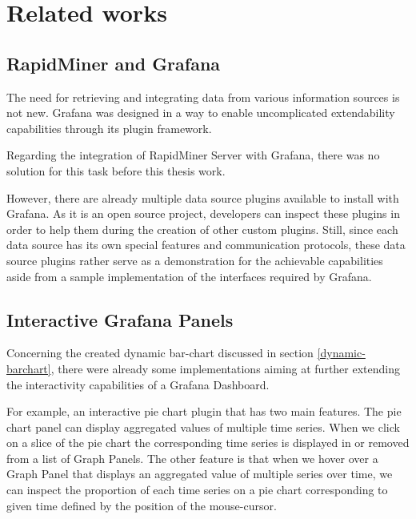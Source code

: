 \chapter{Related works}

%
%
%


\section{RapidMiner and Grafana}

The need for retrieving and integrating data from various information sources is not new. Grafana was designed in a way to enable uncomplicated extendability capabilities through its plugin framework.



Regarding the integration of RapidMiner Server with Grafana, there was no solution for this task before this thesis work.

However, there are already multiple data source plugins available to install with Grafana. As it is an open source project, developers can inspect these plugins in order to help them during the creation of other custom plugins. Still, since each data source has its own special features and communication protocols, these data source plugins rather serve as a demonstration for the achievable capabilities aside from a sample implementation of the interfaces required by Grafana.

\section{Interactive Grafana Panels}
%

Concerning the created dynamic bar-chart discussed in section \ref{dynamic-barchart}, there were already some implementations aiming at further extending the interactivity capabilities of a Grafana Dashboard.

For example, an interactive pie chart plugin that has two main features. The pie chart panel can display aggregated values of multiple time series. When we click on a slice of the pie chart the corresponding time series is displayed in or removed from a list of Graph Panels. The other feature is that when we hover over a Graph Panel that displays an aggregated value of multiple series over time, we can inspect the proportion of each time series on a pie chart corresponding to given time defined by the position of the mouse-cursor.

